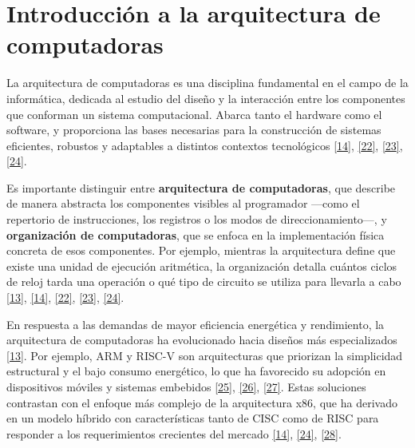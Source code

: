 \documentclass[12pt,oneside]{templates/unerthesis}
\begin{document}
\hypertarget{introducciuxf3n-a-la-arquitectura-de-computadoras}{%
\section{Introducción a la arquitectura de computadoras}\label{introducciuxf3n-a-la-arquitectura-de-computadoras}}

La arquitectura de computadoras es una disciplina fundamental en el campo de la informática, dedicada al estudio del diseño y la interacción entre los componentes que conforman un sistema computacional. Abarca tanto el hardware como el software, y proporciona las bases necesarias para la construcción de sistemas eficientes, robustos y adaptables a distintos contextos tecnológicos \protect\hyperlink{ref-stallings_computer_2013}{{[}14{]}}, \protect\hyperlink{ref-tanenbaum_structured_2013}{{[}22{]}}, \protect\hyperlink{ref-murdocca_principles_2000}{{[}23{]}}, \protect\hyperlink{ref-bryant2015computer}{{[}24{]}}.

Es importante distinguir entre \textbf{arquitectura de computadoras}, que describe de manera abstracta los componentes visibles al programador ---como el repertorio de instrucciones, los registros o los modos de direccionamiento---, y \textbf{organización de computadoras}, que se enfoca en la implementación física concreta de esos componentes. Por ejemplo, mientras la arquitectura define que existe una unidad de ejecución aritmética, la organización detalla cuántos ciclos de reloj tarda una operación o qué tipo de circuito se utiliza para llevarla a cabo \protect\hyperlink{ref-hennessy_computer_2012}{{[}13{]}}, \protect\hyperlink{ref-stallings_computer_2013}{{[}14{]}}, \protect\hyperlink{ref-tanenbaum_structured_2013}{{[}22{]}}, \protect\hyperlink{ref-murdocca_principles_2000}{{[}23{]}}, \protect\hyperlink{ref-bryant2015computer}{{[}24{]}}.

En respuesta a las demandas de mayor eficiencia energética y rendimiento, la arquitectura de computadoras ha evolucionado hacia diseños más especializados \protect\hyperlink{ref-hennessy_computer_2012}{{[}13{]}}. Por ejemplo, ARM y RISC-V son arquitecturas que priorizan la simplicidad estructural y el bajo consumo energético, lo que ha favorecido su adopción en dispositivos móviles y sistemas embebidos \protect\hyperlink{ref-waterman_risc-v_2014}{{[}25{]}}, \protect\hyperlink{ref-harris2015digital}{{[}26{]}}, \protect\hyperlink{ref-null_essentials_2014}{{[}27{]}}. Estas soluciones contrastan con el enfoque más complejo de la arquitectura x86, que ha derivado en un modelo híbrido con características tanto de CISC como de RISC para responder a los requerimientos crecientes del mercado \protect\hyperlink{ref-stallings_computer_2013}{{[}14{]}}, \protect\hyperlink{ref-bryant2015computer}{{[}24{]}}, \protect\hyperlink{ref-patterson_computer_2014}{{[}28{]}}.
\end{document}
